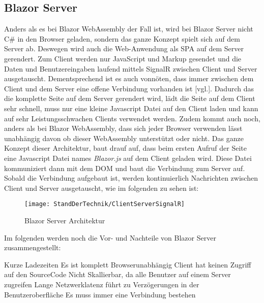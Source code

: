 \subsection{Blazor Server}
Anders als es bei Blazor WebAssembly der Fall ist, wird bei Blazor Server nicht C\# in den
Browser geladen, sondern das ganze Konzept spielt sich auf dem Server ab. Deswegen wird auch die
Web-Anwendung als SPA auf dem Server gerendert. Zum Client werden nur JavaScript und Markup
gesendet und die Daten und Benutzereingaben laufend mittels SignalR zwischen Client und Server
ausgetauscht. Dementsprechend ist es auch vonnöten, dass immer zwischen dem Client und dem Server
eine offene Verbindung vorhanden ist \cite{HierKommtBlazor}[vgl.].
\newline
\newline
Dadurch das die komplette Seite auf dem Server gerendert wird, lädt die Seite auf dem Client sehr
schnell, muss nur eine kleine Javascript Datei auf den Client laden und kann auf sehr
Leistungsschwachen Clients verwendet werden. Zudem kommt auch noch, anders als bei Blazor
WebAssembly, dass sich jeder Browser verwenden lässt unabhängig davon ob dieser WebAssembly
unterstützt oder nicht.
\newline
\newline
Das ganze Konzept dieser Architektur, baut drauf auf, dass beim ersten Aufruf der Seite eine
Javascript Datei names \emph{Blazor.js} auf dem Client geladen wird. Diese Datei kommuniziert dann
mit dem DOM und baut die Verbindung zum Server auf. Sobald die Verbindung aufgebaut ist, werden
kontinuierlich Nachrichten zwischen Client und Server ausgetauscht, wie im folgenden zu sehen ist:

\begin{figure}[h]
    \centering
    \texttt{[image: StandDerTechnik/ClientServerSignalR]}
    \caption[Blazor Server Architektur]{Blazor Server Architektur}
    \label{img:clientserversignalR}
\end{figure}

Im folgenden werden noch die Vor- und Nachteile von Blazor Server zusammengestellt:
\begin{itemize}
    \pro Kurze Ladezeiten
    \pro Es ist komplett Browserunabhängig
    \pro Client hat keinen Zugriff auf den SourceCode
    \con Nicht Skallierbar, da alle Benutzer auf einem Server zugreifen
    \con Lange Netzwerklatenz führt zu Verzögerungen in der Benutzeroberfläche
    \con Es muss immer eine Verbindung bestehen
\end{itemize}